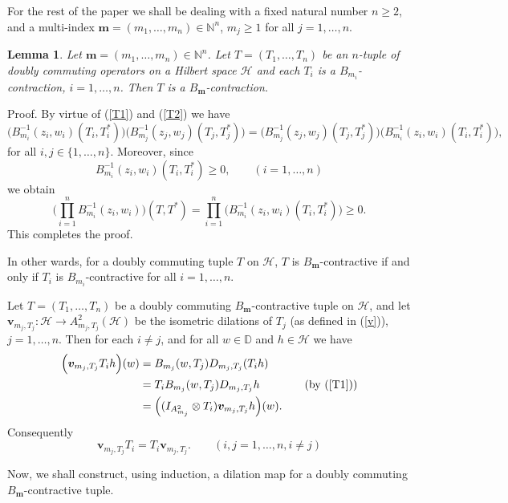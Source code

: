 \documentclass[12pt]{amsart}
\newtheorem{Lemma}[Theorem]{\sc Lemma}
\begin{document}
\textsf{For the rest of the paper we shall be dealing with a fixed
natural number $n \geq 2$, and a multi-index ${\bm{m}} = (m_1, \ldots,
m_n) \in \mathbb{N}^n$, $m_j \geq 1$ for all $j = 1, \ldots, n$.}

\begin{Lemma}\label{lemma1}
Let ${\bm{m}} = (m_1, \ldots, m_n) \in {\mathbb{N}}^n$. Let $T = (T_1, \ldots, T_n)$
be an $n$-tuple of doubly commuting operators on a Hilbert space
${\mathcal{H}}$ and each $T_i$ is a $B_{m_i}$-contraction, $i = 1 , \ldots,
n$. Then $T$ is a $B_{\bm{m}}$-contraction.
\end{Lemma}
{\noindent}\textsf{Proof.} By virtue of (\ref{T1}) and (\ref{T2}) we have
\[\Big(B_{m_i}^{-1}(z_i, w_i) (T_i,
T_i^*) \Big) \Big(B_{m_j}^{-1}(z_j, w_j) (T_j, T_j^*) \Big) =
\Big(B_{m_j}^{-1}(z_j, w_j) (T_j, T_j^*) \Big)
\Big(B_{m_i}^{-1}(z_i, w_i) (T_i, T_i^*) \Big),\]for all $i, j \in
\{1, \ldots, n\}$. Moreover, since \[B_{m_i}^{-1}(z_i, w_i) (T_i,
T_i^*) \geq 0, \quad \quad (i=1, \ldots, n)\]we obtain \[\Big(
\prod_{i=1}^n B_{m_i}^{-1}(z_i, w_i) \Big)(T, T^*) = \prod_{i=1}^n
\Big(B_{m_i}^{-1}(z_i, w_i) (T_i, T_i^*) \Big) \geq 0.\]This
completes the proof. {\hfill \vrule height6pt width 6pt depth 0pt}

In other wards, for a doubly commuting tuple $T$ on ${\mathcal{H}}$, $T$ is
$B_{\bm{m}}$-contractive if and only if $T_i$ is $B_{m_i}$-contractive
for all $i = 1, \ldots, n$.

Let $T = (T_1, \ldots, T_n)$ be a doubly commuting
$B_{\bm{m}}$-contractive tuple on ${\mathcal{H}}$, and let ${\bm{v}}_{m_j, T_j} : {\mathcal{H}}
\longrightarrow A^2_{m_j, T_j}({\mathcal{H}})$ be the isometric dilations of
$T_j$ (as defined in (\ref{v})), $j = 1, \ldots, n$. Then for each
$i \neq j$, and for all $w \in {\mathbb{D}}$ and $h \in {\mathcal{H}}$ we have
\[\begin{split}\Big({\bm{v}}_{m_j, T_j} T_i h\Big)(w) & = B_{m_j}(w, T_j)
D_{m_j,T_j} (T_i h)\\ & = T_i B_{m_j}(w, T_j) D_{m_j,T_j} h
\quad \quad \quad \quad (\mbox{by~} (\ref{T1}))\\
& = \Big((I_{A^2_{m_j}} \otimes T_i) {\bm{v}}_{m_j,
T_j}h\Big)(w).\end{split}\]Consequently
\begin{equation}\label{TiTj} {\bm{v}}_{m_j, T_j} T_i = T_i {\bm{v}}_{m_j,
T_j}. \quad \quad (i, j = 1, \ldots, n, i \neq j)\end{equation}

Now, we shall construct, using induction, a dilation map for a
doubly commuting $B_{\bm{m}}$-contractive tuple.
\end{document}
